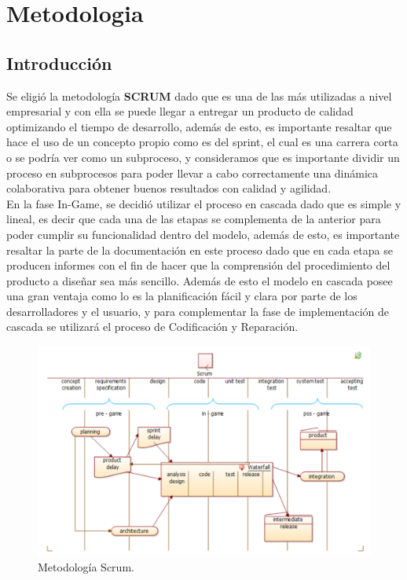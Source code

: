 \chapter{Metodologia}

\section{Introducción}
Se eligió la metodología \textbf{SCRUM} dado que es una de las más utilizadas a nivel empresarial y con ella se puede llegar a entregar un producto de calidad optimizando el tiempo de desarrollo, además de esto, es importante resaltar que hace el uso de un concepto propio como es del sprint, el cual es una carrera corta o se podría ver como un subproceso, y consideramos que es importante dividir un proceso en subprocesos para poder llevar a cabo correctamente una dinámica colaborativa para obtener buenos resultados con calidad y agilidad.\\
En la fase In-Game, se decidió utilizar el proceso en cascada dado que es simple y lineal, es decir que cada una de las etapas se complementa de la anterior para poder cumplir su funcionalidad dentro del modelo, además de esto, es importante resaltar la parte de la documentación en este proceso dado que en cada etapa se producen informes con el fin de hacer que la comprensión del procedimiento del producto a diseñar sea más sencillo. Además de esto el modelo en cascada posee una gran ventaja como lo es la planificación fácil y clara por parte de los desarrolladores y el usuario, y para complementar la fase de implementación de cascada se utilizará el proceso de Codificación y Reparación. \\

\begin{figure}[h]
	\centering
	\includegraphics[scale=0.65,]{imagenes/Metodologia/Scrum.pdf}
	\caption{Metodología Scrum.}
	\label{fig:cronograma}
\end{figure}

